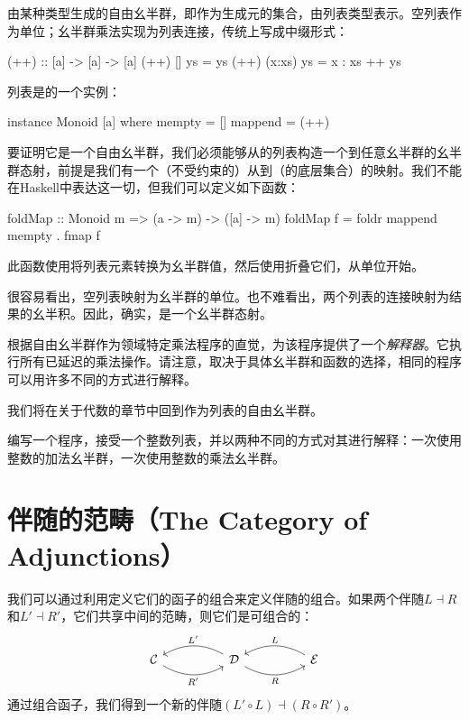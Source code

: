 \documentclass[DaoFP]{subfiles}
\begin{document}
    由某种类型生成的自由幺半群，即作为生成元的集合，由列表类型\hask{[a]}表示。空列表作为单位；幺半群乘法实现为列表连接，传统上写成中缀形式：
    \begin{haskell}
    (++) :: [a] -> [a] -> [a]
    (++) []     ys = ys
    (++) (x:xs) ys = x : xs ++ ys
    \end{haskell}
    列表是的一个实例：
    \begin{haskell}
        instance Monoid [a] where
        mempty = []
        mappend = (++)
    \end{haskell}

    要证明它是一个自由幺半群，我们必须能够从的列表构造一个到任意幺半群的幺半群态射，前提是我们有一个（不受约束的）从到（的底层集合）的映射。我们不能在Haskell中表达这一切，但我们可以定义如下函数：
    \begin{haskell}
        foldMap :: Monoid m => (a -> m) -> ([a] -> m)
        foldMap f = foldr mappend mempty . fmap f
    \end{haskell}
    此函数使用将列表元素转换为幺半群值，然后使用折叠它们，从单位开始。

    很容易看出，空列表映射为幺半群的单位。也不难看出，两个列表的连接映射为结果的幺半积。因此，确实，是一个幺半群态射。

    根据自由幺半群作为领域特定乘法程序的直觉，为该程序提供了一个\emph{解释器}。它执行所有已延迟的乘法操作。请注意，取决于具体幺半群和函数的选择，相同的程序可以用许多不同的方式进行解释。

    我们将在关于代数的章节中回到作为列表的自由幺半群。

    \begin{exercise}
        编写一个程序，接受一个整数列表，并以两种不同的方式对其进行解释：一次使用整数的加法幺半群，一次使用整数的乘法幺半群。
    \end{exercise}

    \section{伴随的范畴（The Category of Adjunctions）}
    我们可以通过利用定义它们的函子的组合来定义伴随的组合。如果两个伴随$L \dashv R$和$L' \dashv R'$，它们共享中间的范畴，则它们是可组合的：
    \[
        \begin{tikzcd}
            \mathcal{C}
            \arrow[rr, bend right, "R'"']
            &&
            \mathcal{D}
            \arrow[ll, bend right, "L'"']
            \arrow[rr, bend right, "R"']
            &&
            \mathcal{E}
            \arrow[ll, bend right, "L"']
        \end{tikzcd}
    \]
    通过组合函子，我们得到一个新的伴随$(L' \circ L) \dashv (R \circ R')$。
\end{document}
